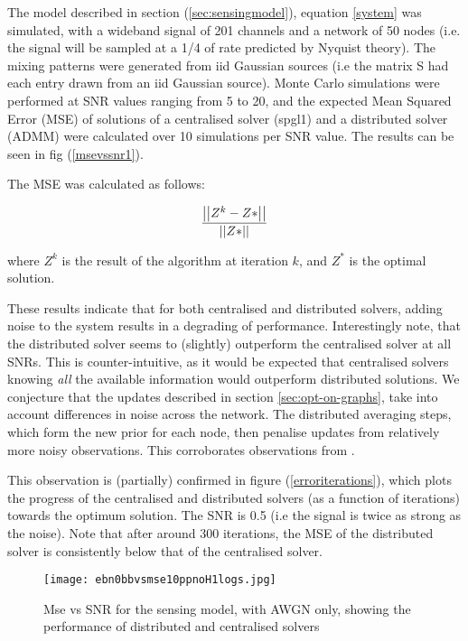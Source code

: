 The model described in section (\ref{sec:sensingmodel}), equation \eqref{system} was simulated, with a wideband signal of 201 channels and a network of 50 nodes (i.e. the signal will be sampled at a 1/4 of rate predicted by Nyquist theory). The mixing patterns were generated from iid Gaussian sources (i.e the matrix S had each entry drawn from an iid Gaussian source). Monte Carlo simulations were performed at SNR values ranging from 5 to 20, and the expected Mean Squared Error (MSE) of solutions of a centralised solver (spgl1) and a distributed solver (ADMM) were calculated over 10 simulations per SNR value. The results can be seen in fig (\ref{msevssnr1}). 

The MSE was calculated as follows:

\begin{equation}
\frac{\left|\left|Z^k - Z*\right|\right|}{\left|\left|Z*\right|\right|}
\end{equation}

where \(Z^k\) is the result of the algorithm at iteration \(k\), and \(Z^*\) is the optimal solution.

These results indicate that for both centralised and distributed solvers, adding noise to the system results in a degrading of performance. Interestingly note, that the distributed solver seems to (slightly) outperform the centralised solver at all SNRs. This is counter-intuitive, as it would be expected that centralised solvers knowing \textit{all} the available information would outperform distributed solutions. We conjecture that the updates described in section \eqref{sec:opt-on-graphs}, take into account differences in noise across the network. The distributed averaging steps, which form the new prior for each node, then penalise updates from relatively more noisy observations. This corroborates observations from \cite{bazerque2008}.

This observation is (partially) confirmed in figure (\ref{erroriterations}), which plots the progress of the centralised and distributed solvers (as a function of iterations) towards the optimum solution. The SNR is 0.5 (i.e the signal is twice as strong as the noise). Note that after around 300 iterations, the MSE of the distributed solver is consistently below that of the centralised solver.

\begin{figure}[h]
\centering
\texttt{[image: ebn0bbvsmse10ppnoH1logs.jpg]}
\caption{Mse vs SNR for the sensing model, with AWGN only, showing the performance of distributed and centralised solvers}
\label{msevssnr0}
\end{figure}

